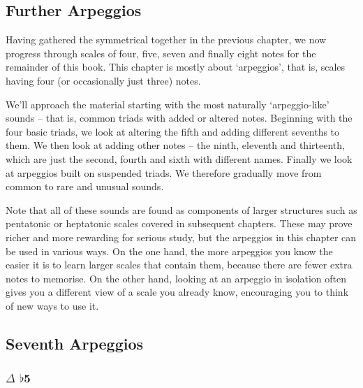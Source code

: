 \documentclass[english]{./gbook}
\begin{document}
\begin{large}




\chapter{\mbox{Further} \mbox{Arpeggios}}

Having gathered the symmetrical together in the previous chapter, we now progress through scales of four, five, seven and finally eight notes for the remainder of this book. This chapter is mostly about `arpeggios', that is, scales having four (or occasionally just three) notes. 

We'll approach the material starting with the most naturally `arpeggio-like' sounds -- that is, common triads with added or altered notes. Beginning with the four basic triads, we look at altering the fifth and adding different sevenths to them. We then look at adding other notes -- the ninth, eleventh and thirteenth, which are just the second, fourth and sixth with different names. Finally we look at arpeggios built on suspended triads. We therefore gradually move from common to rare and unusual sounds. 

Note that all of these sounds are found as components of larger structures such as pentatonic or heptatonic scales covered in subsequent chapters. These may prove richer and more rewarding for serious study, but the arpeggios in this chapter can be used in various ways. On the one hand, the more arpeggios you know the easier it is to learn larger scales that contain them, because there are fewer extra notes to memorise. On the other hand, looking at an arpeggio in isolation often gives you a different view of a scale you already know, encouraging you to think of new ways to use it.


\section{Seventh Arpeggios}

\subsection*{$\Delta$ $\flat$5}

\[
\begin{array}{ll}
	\begin{array}{c}
		\begin{array}{ccc}
			&%
			&%
		\end{array}
		\\
		\begin{array}{cc}
			&%
		\end{array}
	\end{array}


\end{array}\]
\end{large}
\end{document}
